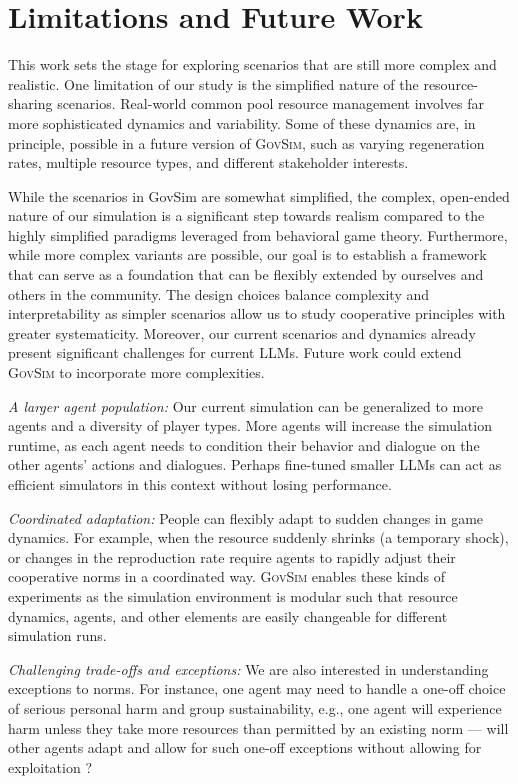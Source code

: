 \documentclass{article}
\newcommand{\envAbbr}{\textsc{GovSim}\xspace}
\begin{document}
%


\section{Limitations and Future Work}
\label{sec:limitations_futurework}
This work sets the stage for exploring scenarios that are still more complex and realistic. One limitation of our study is the simplified nature of the resource-sharing scenarios.  Real-world common pool resource management involves far more sophisticated dynamics and variability. Some of these dynamics are, in principle, possible in a future version of \envAbbr, such as varying regeneration rates, multiple resource types, and different stakeholder interests. 

%
While the scenarios in GovSim are somewhat simplified, the complex, open-ended nature of our simulation is a significant step towards realism compared to the highly simplified paradigms leveraged from behavioral game theory. Furthermore, while more complex variants are possible, our goal is to establish a framework that can serve as a foundation that can be flexibly extended by ourselves and others in the community. The design choices balance complexity and interpretability as simpler scenarios allow us to study cooperative principles with greater systematicity. Moreover, our current scenarios and dynamics already present significant challenges for current LLMs. 
Future work could extend \envAbbr to incorporate more complexities.

\textit{A larger agent population:} Our current simulation can be generalized to more agents and a diversity of player types. More agents will increase the simulation runtime, as each agent needs to condition their behavior and dialogue on the other agents' actions and dialogues. Perhaps fine-tuned smaller LLMs can act as efficient simulators in this context without losing performance. 

\textit{Coordinated adaptation:} People can flexibly adapt to sudden changes in game dynamics. For example, when the resource suddenly shrinks (a temporary shock), or changes in the reproduction rate require agents to rapidly adjust their cooperative norms in a coordinated way. \envAbbr enables these kinds of experiments as the simulation environment is modular such that resource dynamics, agents, and other elements are easily changeable for different simulation runs.

\textit{Challenging trade-offs and exceptions:} We are also interested in understanding exceptions to norms. For instance, one agent may need to handle a one-off choice of serious personal harm and group sustainability, e.g., one agent will experience harm unless they take more resources than permitted by an existing norm –-- will other agents adapt and allow for such one-off exceptions without allowing for exploitation \cite{awad2024acceptable, levine2024rules}?
\end{document}
